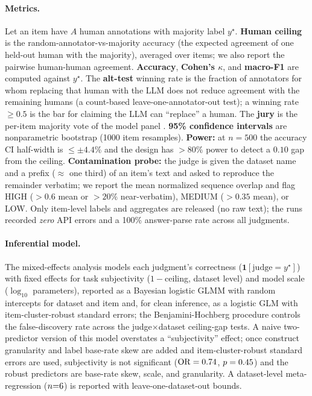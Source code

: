 \paragraph{Metrics.} Let an item have $A$ human annotations with majority label $y^\star$.
\textbf{Human ceiling} is the random-annotator-vs-majority accuracy (the expected agreement of one held-out human
with the majority), averaged over items; we also report the pairwise human-human agreement. \textbf{Accuracy},
\textbf{Cohen's $\kappa$}, and \textbf{macro-F1} are computed against $y^\star$. The \textbf{alt-test} winning rate
\citep{calderon2025alttest} is the fraction of annotators for whom replacing that human with the LLM does not reduce
agreement with the remaining humans (a count-based leave-one-annotator-out test); a winning rate $\ge0.5$ is the bar
for claiming the LLM can ``replace'' a human. The \textbf{jury} is the per-item majority vote of the model panel
\citep{verga2024poll}. \textbf{95\% confidence intervals} are nonparametric bootstrap (1000 item resamples).
\textbf{Power:} at $n{=}500$ the accuracy CI half-width is $\le\pm4.4\%$ and the design has $>80\%$ power to detect a
$0.10$ gap from the ceiling. \textbf{Contamination probe:} the judge is given the dataset name and a prefix
($\approx$ one third) of an item's text and asked to reproduce the remainder verbatim; we report the mean normalized
sequence overlap and flag HIGH ($>0.6$ mean or $>20\%$ near-verbatim), MEDIUM ($>0.35$ mean), or LOW. Only item-level
labels and aggregates are released (no raw text); the runs recorded \emph{zero} API errors and a 100\% answer-parse
rate across all \STHRn{} judgments.

\paragraph{Inferential model.} The mixed-effects analysis models each judgment's correctness
($\mathbf{1}[\text{judge}=y^\star]$) with fixed effects for task subjectivity ($1-$ceiling, dataset level) and model
scale ($\log_{10}$ parameters), reported as a Bayesian logistic GLMM with random intercepts for dataset and item and,
for clean inference, as a logistic GLM with item-cluster-robust standard errors; the Benjamini-Hochberg procedure
controls the false-discovery rate across the \SMEfdrtests{} judge$\times$dataset ceiling-gap tests. A naive
two-predictor version of this model overstates a ``subjectivity'' effect; once construct granularity and label
base-rate skew are added and item-cluster-robust standard errors are used, subjectivity is not significant
($\mathrm{OR}=0.74$, $p=0.45$) and the robust predictors are base-rate skew, scale, and granularity. A
dataset-level meta-regression ($n{=}6$) is reported with leave-one-dataset-out bounds.

